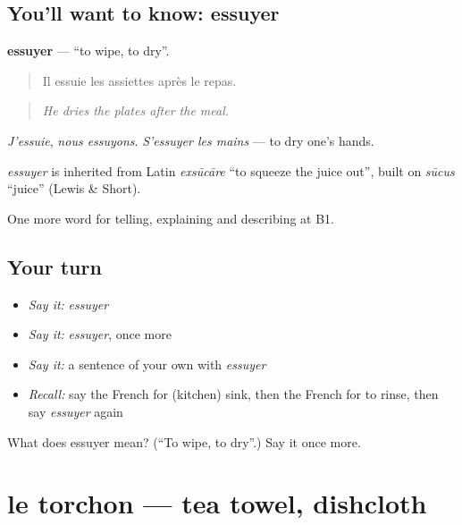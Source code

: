 \subsection*{You'll want to know: essuyer}
\textbf{essuyer} — \textquotedblleft{}to wipe, to dry\textquotedblright{}.

\begin{quote}
Il essuie les assiettes après le repas.
\end{quote}

\begin{quote}
\emph{He dries the plates after the meal.}
\end{quote}

\emph{J'essuie}, \emph{nous essuyons}. \emph{S'essuyer les mains} — to dry one's hands.

\begin{cousinweb}
\emph{essuyer} is inherited from Latin \emph{exsūcāre} \textquotedblleft{}to squeeze the juice out\textquotedblright{}, built on \emph{sūcus} \textquotedblleft{}juice\textquotedblright{} (Lewis \& Short).
\end{cousinweb}

\begin{grammarlens}[title={What you've built}]
One more word for telling, explaining and describing at B1.
\end{grammarlens}

\subsection*{Your turn}
\begin{itemize}
\raggedright
  \item \emph{Say it:} \emph{essuyer}
  \item \emph{Say it:} \emph{essuyer}, once more
  \item \emph{Say it:} a sentence of your own with \emph{essuyer}
  \item \emph{Recall:} say the French for (kitchen) sink, then the French for to rinse, then say \emph{essuyer} again
\end{itemize}

\begin{tcolorbox}[breakable,colback=teal!4,colframe=teal!35!black,title={Before you move on}]
What does essuyer mean? (\textquotedblleft{}To wipe, to dry\textquotedblright{}.) Say it once more.
\end{tcolorbox}
\section[le torchon]{le torchon — tea towel, dishcloth}

